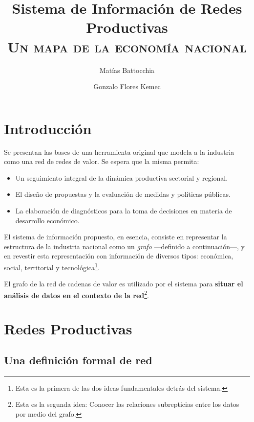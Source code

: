 \documentclass[a4paper]{report}
\begin{document}
\title{Sistema de Información de Redes Productivas\\\textsc{Un mapa de la economía nacional}}
\author{Matías Battocchia \and Gonzalo Flores Kemec}

\maketitle

\section*{Introducción}


Se presentan las bases de una herramienta original que modela a la industria como una red de redes de valor. Se espera que la misma permita:

\begin{itemize}
  \item Un seguimiento integral de la dinámica productiva sectorial y regional.
  \item El diseño de propuestas y la evaluación de medidas y políticas públicas.
  \item La elaboración de diagnósticos para la toma de decisiones en materia de desarrollo económico.
\end{itemize}

El sistema de información propuesto, en esencia, consiste en representar la estructura de la industria nacional como un \textit{grafo} —definido a continuación—, y en revestir esta representación con información de diversos tipos: económica, social, territorial y tecnológica\footnote{Esta es la primera de las dos ideas fundamentales detrás del sistema.}.

El grafo de la red de cadenas de valor es utilizado por el sistema para \textbf{situar el análisis de datos en el contexto de la red}\footnote{Esta es la segunda idea: Conocer las relaciones subrepticias entre los datos por medio del grafo.}.

\section*{Redes Productivas}

\subsection*{Una definición formal de red}
\end{document}
